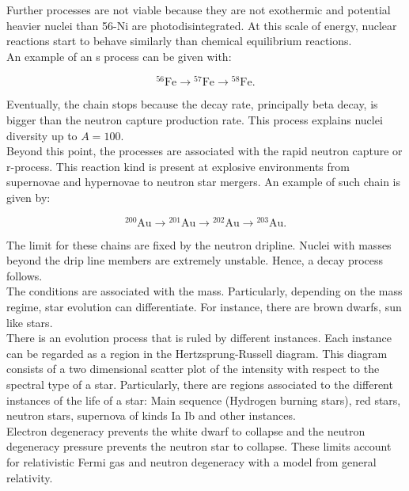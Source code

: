 \documentclass[openany]{book}
\begin{document}
Further processes are not viable because they are not exothermic and potential heavier nuclei than 56-Ni are photodisintegrated. At this scale of energy, nuclear reactions start to behave similarly than chemical equilibrium reactions. \\ 

An example of an s process can be given with:

\begin{equation}\label{eq:reactions_sProcess}
	\mathrm{{}^{56}Fe \rightarrow {}^{57}Fe \rightarrow  {}^{58}Fe }.
\end{equation}

Eventually, the chain stops because the decay rate, principally beta decay, is bigger than the neutron capture production rate. This process explains nuclei diversity up to $A = 100$. \\

Beyond this point, the processes are associated with the rapid neutron capture or r-process. This reaction kind is present at explosive environments from supernovae and hypernovae to neutron star mergers. An example of such chain is given by: 

\begin{equation}\label{eq:reactions_rProcess}
	\mathrm{{}^{200}Au \rightarrow {}^{201}Au \rightarrow  {}^{202}Au \rightarrow  {}^{203}Au}.
\end{equation}

The limit for these chains are fixed by the neutron dripline. Nuclei with masses beyond the drip line members are extremely unstable. Hence, a decay process follows. \\

The conditions are associated with the mass. Particularly, depending on the mass regime, star evolution can differentiate. For instance, there are brown dwarfs, sun like stars. \\

There is an evolution process that is ruled by different instances. Each instance can be regarded as a region in the Hertzsprung-Russell diagram. This diagram consists of a two dimensional scatter plot of the intensity with respect to the spectral type of a star. Particularly, there are regions associated to the different instances of the life of a star: Main sequence (Hydrogen burning stars), red stars, neutron stars, supernova of kinds Ia Ib and other instances. \\

Electron degeneracy prevents the white dwarf to collapse and the neutron degeneracy pressure prevents the neutron star to collapse. These limits account for relativistic Fermi gas and neutron degeneracy with a model from general relativity. \\
\end{document}

